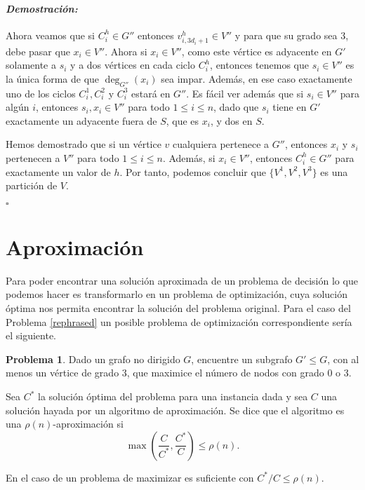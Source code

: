 \documentclass[10pt]{amsart}
\theoremstyle{definition}
\newtheorem{prob}[theorem]{Problema}
\numberwithin{equation}{section}
\newenvironment{myproof} {\paragraph{\emph{Demostraci\'on:}}}{\hfill$\square$}
\begin{document}
\begin{myproof}
	Ahora veamos que si $C_i^h \in G''$ entonces $v_{i,3d_i + 1}^h \in V''$ y para que su grado sea $3$, debe pasar que $x_i \in V''$. Ahora si $x_i \in V''$, como este v\'ertice es adyacente en $G'$ solamente a $s_i$ y a dos v\'ertices en cada ciclo $C_i^h$, entonces tenemos que $s_i \in V''$ es la \'unica forma de que $\deg_{G''}(x_i)$ sea impar. Adem\'as, en ese caso exactamente uno de los ciclos $C_i^1, C_i^2$ y $C_i^3$ estar\'a en $G''$. Es f\'acil ver adem\'as que si $s_i \in V''$ para alg\'un $i$, entonces $s_i, x_i \in V''$ para todo $1 \le i \le n$, dado que $s_i$ tiene en $G'$ exactamente un adyacente fuera de $S$, que es $x_i$, y dos en $S$.
	
	Hemos demostrado que si un v\'ertice $v$ cualquiera pertenece a $G''$, entonces $x_i$ y  $s_i$ pertenecen a $V''$ para todo $1 \le i \le n$. Adem\'as, si $x_i \in V''$, entonces $C_i^h \in G''$ para exactamente un valor de $h$.  Por tanto, podemos concluir que $\{V^1, V^2, V^3\}$ es una partici\'on de $V$. 
	
\end{myproof}
	
	\section{Aproximaci\'on}
	
	Para  poder encontrar una soluci\'on aproximada de un problema de decisi\'on lo que podemos hacer es transformarlo en un problema de optimizaci\'on, cuya soluci\'on \'optima nos permita encontrar la soluci\'on del problema original. Para el caso del Problema \ref{rephrased} un posible problema de optimizaci\'on correspondiente ser\'ia el siguiente.
	
	\begin{prob} \label{bad_opt}
		Dado un grafo no dirigido $G$, encuentre un subgrafo $G' \le G$, con al menos un v\'ertice de grado $3$, que maximice el n\'umero de nodos con grado $0$ o $3$.  
	\end{prob}
	
	Sea $C^*$ la soluci\'on \'optima del problema para una instancia dada y sea $C$ una soluci\'on hayada por un algoritmo de aproximaci\'on. Se dice que el algoritmo es una $\rho(n)$-aproximaci\'on si 
	\[
		\max{ \left ( \frac{C}{C^*}, \frac{C^*}{C} \right )} \le \rho(n).
	\]
	
	En el caso de un problema de maximizar es suficiente con $ C^*/C  \le \rho(n)$. 
	
\end{document}
